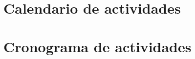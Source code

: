 \documentclass[8pt,letterpaper,final]{article}
\begin{document}
    \section*{Calendario de actividades}
    
    \section*{Cronograma de actividades}
    
    \clearpage
\end{document}
